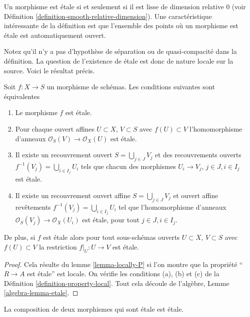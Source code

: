 \noindent
Un morphisme est étale si et seulement si il est lisse de dimension relative
$0$ (voir Définition \ref{definition-smooth-relative-dimension}). Une caractéristique intéressante
de la définition est que l'ensemble des points où un morphisme
est étale est automatiquement ouvert.

\medskip\noindent Notez
qu'il n'y a pas d'hypothèse de séparation ou de quasi-compacité dans la définition.
La question de l'existence de étale est donc de nature locale
sur la source. Voici le résultat précis.

\begin{lemma}
\label{lemma-etale-characterize}
Soit $f : X \to S$ un morphisme de schémas. Les conditions
suivantes sont équivalentes
\begin{enumerate}
\item Le morphisme $f$ est étale.
\item Pour chaque ouvert affines $U \subset X$, $V \subset S$
avec $f(U) \subset V$ l'homomorphisme
d'anneaux $\mathcal{O}_S(V) \to \mathcal{O}_X(U)$ est étale.
\item Il existe un recouvrement ouvert $S = \bigcup_{j \in J} V_j$ et
des recouvrements ouverts $f^{-1}(V_j) = \bigcup_{i \in I_j} U_i$ tels que chacun
des morphismes $U_i \to V_j$, $j\in J, i\in I_j$ est
étale.
\item Il existe un recouvrement ouvert affine $S = \bigcup_{j \in J} V_j$
et ouvert affine revêtements $f^{-1}(V_j) = \bigcup_{i \in I_j} U_i$ tel que l'homomorphisme
d'anneaux $\mathcal{O}_S(V_j) \to \mathcal{O}_X(U_i)$ est étale,
pour tout $j\in J, i\in I_j$.
\end{enumerate}
De plus, si $f$ est étale
alors pour tout sous-schémas ouverts $U \subset X$, $V \subset S$ avec $f(U) \subset V$
la restriction $f|_U : U \to V$ est étale.
\end{lemma}

\begin{proof}
Cela résulte du lemme \ref{lemma-locally-P} si l'on montre que la propriété
``$R \to A$ est étale''
est locale. On vérifie les conditions (a),
(b) et (c) de la Définition
\ref{definition-property-local}. Tout cela découle de l'algèbre, Lemme \ref{algebra-lemma-etale}.
\end{proof}

\begin{lemma}
\label{lemma-composition-etale}
La composition de deux morphismes qui sont étale est étale.
\end{lemma}

